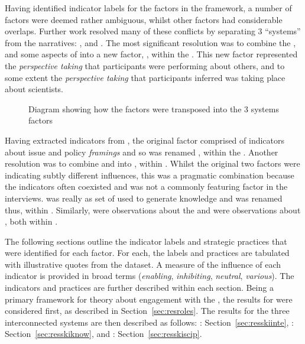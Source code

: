 Having identified indicator labels for the factors in the \ISM{} framework, a number of factors were deemed rather ambiguous, whilst other factors had considerable overlaps. Further work resolved many of these conflicts by separating 3 ``systems'' from the narratives: \skiinte, \skiknow{} and \skiscip. The most significant resolution was to combine the \ISM{} \ismsn, \ismst{} and some aspects of \ismsm{} into a new factor, \skipers, within the \skiinte. This new factor represented the \emph{perspective taking} that participants were performing about others, and to some extent the \emph{perspective taking} that participants inferred was taking place about scientists. 

\begin{figure}
    \centering
    \caption{Diagram showing how the \ISM{} factors were transposed into the 3 systems factors}
    \label{fig:resski}
\end{figure}

Having extracted \skipers{} indicators from \ismsm, the original \ISM{} factor comprised of indicators about issue and policy \emph{framings} and so was renamed \skifram, within the \skiknow. Another resolution was to combine \ISM{} \ismic{} and \ismia{} into \skiagen, within \skiinte. Whilst the original two factors were indicating subtly different influences, this was a pragmatic combination because the indicators often coexisted and \ismic{} was not a commonly featuring factor in the interviews. \ISM{} \ismmt{} was really as set of \skitech{} used to generate knowledge and was renamed thus, within \skiknow. Similarly, \ISM{} \ismmr{} were observations about the \skipoli{} and \ismmts{} were observations about \skieven{}, both within \skiscip.

The following sections outline the indicator labels and strategic practices that were identified for each factor. For each, the labels and practices are tabulated with illustrative quotes from the dataset. A measure of the influence of each indicator is provided in broad terms (\emph{enabling}, \emph{inhibiting}, \emph{neutral}, \emph{various}). The indicators and practices are further described within each section. Being a primary framework for theory about engagement with the \SPI, the results for \skirole{} were considered first, as described in Section~\ref{sec:resroles}. The results for the three interconnected systems are then described as follows: \skiinte: Section~\ref{sec:resskiinte}, \skiknow: Section~\ref{sec:resskiknow}, and \skiscip: Section~\ref{sec:resskiscip}. 

